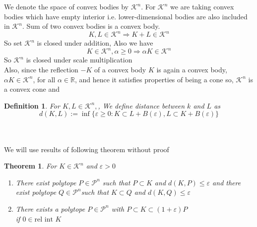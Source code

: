 \documentclass[oneside]{book}
\newtheorem{theorem}{Theorem}[section]
\newtheorem{mydef}{Definition}
\begin{document}
     
 
 
 
 
 
 
 
 
 We denote  the space of convex bodies by  $\mathcal{K}^{n}$. For  $\mathcal{K}^{n}$  we are taking convex bodies which have empty interior i.e. lower-dimensional bodies are also included in $\mathcal{K}^{n}$. 
 Sum of two convex bodies is a convex body. \\
 $$
   K, L \in \mathcal{K}^{n} \Longrightarrow K+L \in \mathcal{K}^{n}
$$ 
 So  set $\mathcal{K}^{n}$ is closed under addition,
 Also we have
 $$ 
K \in \mathcal{K}^{n}, \alpha \geq 0 \Longrightarrow \alpha K \in \mathcal{K}^{n}
$$
So  $\mathcal{K}^{n}$ is closed under scale multiplication \\
Also, since the reflection $-K$ of a convex body $K$ is again a convex body, $\alpha K \in \mathcal{K}^{n}$, for all $\alpha \in \mathbb{R}$, and hence it satisfies properties of being a cone so,  $\mathcal{K}^{n}$ is a convex cone and 
\begin{mydef}	
For  $ K, L \in \mathcal{K}^{n}, $, We define distance between $k$ and $L$ as 
\begin{equation}
\label{eq42}
d(K, L):=\inf \{\varepsilon \geq 0: K \subset L+B(\varepsilon), L \subset K+B(\varepsilon)\}
\end{equation}
\end{mydef}
\quad 
\\\\
We will use results of following theorem without proof 
\begin{theorem}
\label{t:8}
For  $K \in \mathcal{K}^{n}$ and $\varepsilon>0$ \\
\begin{enumerate}
\item
There exist  polytope $ P  \in \mathcal{P}^{n}$ such that  $P \subset K$ and  $d(K, P) \leq \varepsilon$ \newline 
and \newline
  there exist polytope $Q \in \mathcal{P}^{n}$such that  $K \subset Q$ and $d(K, Q) \leq \varepsilon$ 
\item 
  There exists a polytope $P \in \mathcal{P}^{n}$ with $P \subset K \subset(1+\varepsilon) P$ \\
  if $0 \in \text{rel int } K $ \label{4.1.5}
\end{enumerate}
\end{theorem}
\end{document}
